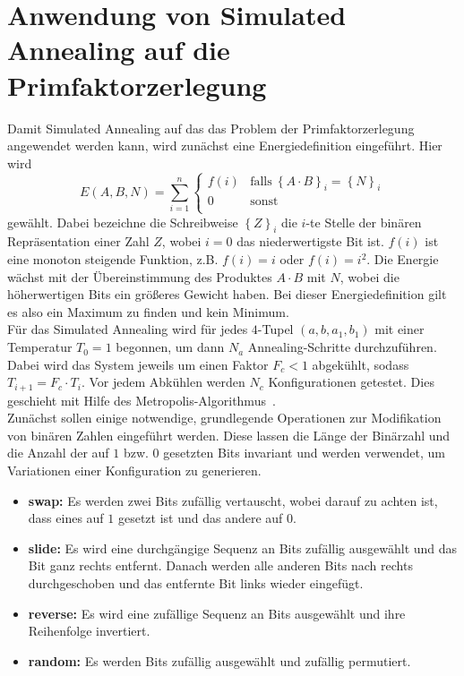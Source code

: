 \section{Anwendung von Simulated Annealing auf die Primfaktorzerlegung}\label{sec:annealfac}
Damit Simulated Annealing auf das das Problem der Primfaktorzerlegung angewendet werden kann, wird zunächst eine Energiedefinition eingeführt. Hier wird
\begin{equation*}
		E\left(A,B,N\right)=\sum\limits_{i=1}^n\begin{cases}
		  		f\left(i\right) & \mathrm{falls}\:{\left\{A\cdot B\right\}}_i={\left\{N\right\}}_i \\
						0 & \mathrm{sonst}\\
				\end{cases}
\end{equation*}
gewählt. Dabei bezeichne die Schreibweise ${\left\{Z\right\}}_i$ die $i$-te Stelle der binären Repräsentation einer Zahl $Z$, wobei $i=0$ das niederwertigste Bit ist. $f\left(i\right)$ ist eine monoton steigende Funktion, z.B. $f\left(i\right)=i$ oder $f\left(i\right)=i^2$. Die Energie wächst mit der Übereinstimmung des Produktes $A\cdot B$ mit $N$, wobei die höherwertigen Bits ein größeres Gewicht haben. Bei dieser Energiedefinition gilt es also ein Maximum zu finden und kein Minimum. \\
Für das Simulated Annealing wird für jedes $4$-Tupel $\left(a,b,a_1,b_1\right)$ mit einer Temperatur $T_0=1$ begonnen, um dann $N_a$ Annealing-Schritte durchzuführen. Dabei wird das System jeweils um einen Faktor $F_c < 1$ abgekühlt, sodass $T_{i+1}=F_c\cdot T_i$. Vor jedem Abkühlen werden $N_c$ Konfigurationen getestet. Dies geschieht mit Hilfe des Metropolis-Algorithmus~\parencite{metropolis}. \\
Zunächst sollen einige notwendige, grundlegende Operationen zur Modifikation von binären Zahlen eingeführt werden. Diese lassen die Länge der Binärzahl und die Anzahl der auf $1$ bzw. $0$ gesetzten Bits invariant und werden verwendet, um Variationen einer Konfiguration zu generieren.
\begin{itemize}
		\item \textbf{swap:} Es werden zwei Bits zufällig vertauscht, wobei darauf zu achten ist, dass eines auf $1$ gesetzt ist und das andere auf $0$.
		\item \textbf{slide:} Es wird eine durchgängige Sequenz an Bits zufällig ausgewählt und das Bit ganz rechts entfernt. Danach werden alle anderen Bits nach rechts durchgeschoben und das entfernte Bit links wieder eingefügt.
		\item \textbf{reverse:} Es wird eine zufällige Sequenz an Bits ausgewählt und ihre Reihenfolge invertiert.
		\item \textbf{random:} Es werden Bits zufällig ausgewählt und zufällig permutiert.
\end{itemize}

